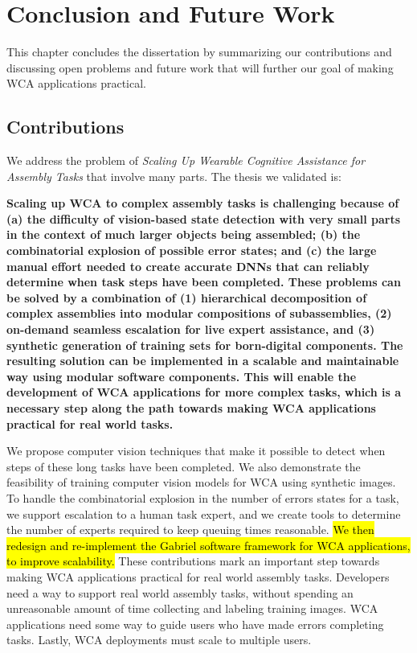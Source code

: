 \chapter{Conclusion and Future Work}\label{chap:conclusion}

This chapter concludes the dissertation by summarizing our contributions and
discussing open problems and future work that will further our goal of making
WCA applications practical.

\section{Contributions}

We address the problem of \textit{Scaling Up Wearable Cognitive Assistance for
  Assembly Tasks} that involve many parts.
The thesis we validated is:

\textbf{
  Scaling up WCA to complex assembly tasks is challenging because of
  (a) the difficulty of
  vision-based state detection with very small parts in the context of much
  larger objects being assembled; (b) the combinatorial explosion
  of possible error states; and (c) the large manual effort needed to create
  accurate DNNs that can reliably determine when task steps have been completed.
  These problems can be solved by a combination of (1) hierarchical
  decomposition of
  complex assemblies into modular compositions of subassemblies, (2) on-demand
  seamless
  escalation for live expert assistance, and (3) synthetic generation of
  training
  sets for born-digital components. The resulting solution can be implemented in
  a scalable and maintainable way using modular software components.
  This will enable the development of WCA applications for more complex tasks,
  which is a necessary step along the path towards making WCA applications
  practical for real world tasks.
}

We propose computer vision techniques that make it possible to detect when steps
of these long tasks have been completed.
We also demonstrate the feasibility of training computer vision models for WCA
using synthetic images.
To handle the combinatorial explosion in the number of errors states for a task,
we support escalation to a human task expert, and we create tools to determine
the number of experts required to keep queuing times reasonable.
\hl{
  We then redesign and re-implement the Gabriel software framework for WCA
  applications, to improve scalability.
}
These contributions mark an important step towards making WCA applications
practical for real world assembly tasks.
Developers need a way to support real world assembly tasks, without spending an
unreasonable amount of time collecting and labeling training images.
WCA applications need some way to guide users who have made errors completing
tasks.
Lastly, WCA deployments must scale to multiple users.

